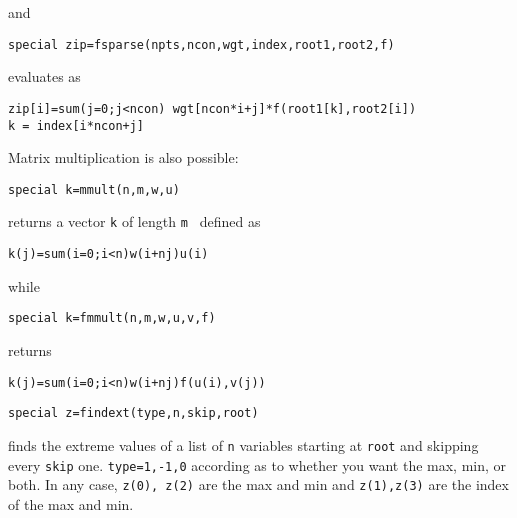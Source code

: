 and 
\begin{verbatim}
special zip=fsparse(npts,ncon,wgt,index,root1,root2,f)
\end{verbatim}
evaluates as 
\begin{verbatim}
zip[i]=sum(j=0;j<ncon) wgt[ncon*i+j]*f(root1[k],root2[i])
k = index[i*ncon+j] 
\end{verbatim}
Matrix multiplication is also possible:
\begin{verbatim}
special k=mmult(n,m,w,u)
\end{verbatim}
returns a vector {\tt k}  of length {\tt m } defined as
\begin{verbatim}
k(j)=sum(i=0;i<n)w(i+nj)u(i)
\end{verbatim}
while
 \begin{verbatim}
special k=fmmult(n,m,w,u,v,f)
\end{verbatim} 
returns
\begin{verbatim}
k(j)=sum(i=0;i<n)w(i+nj)f(u(i),v(j))
\end{verbatim}

\begin{verbatim}
special z=findext(type,n,skip,root)
\end{verbatim}
finds the extreme values of a list of {\tt n} variables starting at {\tt root} and skipping every {\tt skip} one.  {\tt type=1,-1,0} according as to whether you want the max, min, or both. In any case, {\tt z(0), z(2)} are the max and min and {\tt z(1),z(3)} are the index of the max and min.  

\medskip

